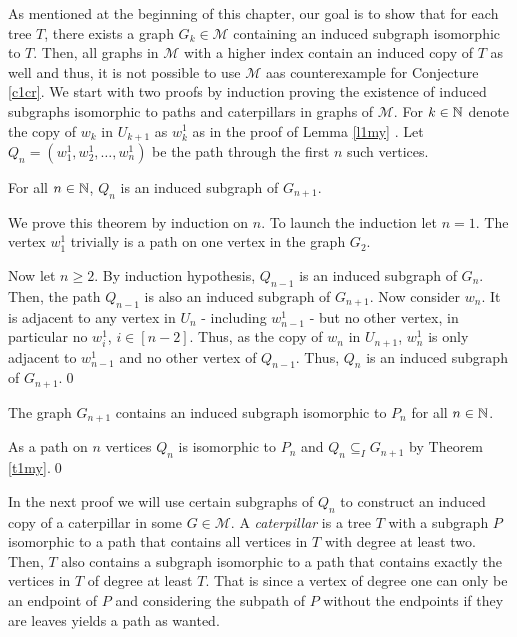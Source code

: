 As mentioned at the beginning of this chapter, our goal is to show that for each tree $T$, there exists a graph $G_k\in\mathcal{M}$ containing an induced subgraph isomorphic to $T$. Then, all graphs in $\mathcal{M}$ with a higher index contain an induced copy of $T$ as well and thus, it is not possible to use $\mathcal{M}$ aas counterexample for Conjecture \ref{c1cr}.
We start with two proofs by induction proving the existence of induced subgraphs isomorphic to paths and caterpillars in graphs of $\mathcal{M}$. For $k\in\mathbb{N}$ denote the copy of $w_k$ in $U_{k+1}$ as $w_k^1$ as in the proof of Lemma \ref{l1my} . Let $Q_n =(w_1^1 ,w_2^1 ,\dots ,w_n^1)$ be the path through the first $n$ such vertices. 
\begin{thm}\label{t1my}
For all $n\in\mathbb{N}$, $Q_n$ is an induced subgraph of $G_{n+1}$.
\end{thm}
\begin{prf}
We prove this theorem by induction on $n$. To launch the induction let $n=1$. The vertex $w_1^1$ trivially is a path on one vertex in the graph $G_2$.

Now let $n\geq 2$. By induction hypothesis, $Q_{n-1}$ is an induced subgraph of $G_n$. Then, the path $Q_{n-1}$ is also an induced subgraph of $G_{n+1}$. 
Now consider $w_n$. It is adjacent to any vertex in $U_n$ - including $w^1_{n-1}$ - but no other vertex, in particular no $w^1_i$, $i\in [n-2]$. Thus, as the copy of $w_n$ in $U_{n+1}$, $w^1_n$ is only adjacent to $w^1_{n-1}$ and no other vertex of $Q_{n-1}$. Thus, $Q_n$ is an induced subgraph of $G_{n+1}$.\qed
\end{prf}

\begin{cor}\label{c1my}
The graph $G_{n+1}$ contains an induced subgraph isomorphic to $P_n$ for all $n\in\mathbb{N}$.
\end{cor}
\begin{prf}
As a path on $n$ vertices $Q_n$ is isomorphic to $P_n$ and $Q_n\subseteq_I G_{n+1}$ by Theorem \ref{t1my}.\qed
\end{prf}

In the next proof we will use certain subgraphs of $Q_n$ to construct an induced copy of a caterpillar in some $G\in\mathcal{M}$. A \textit{caterpillar} is a tree $T$ with a subgraph $P$ isomorphic to a path that contains all vertices in $T$ with degree at least two. Then, $T$ also contains a subgraph isomorphic to a path that contains exactly the vertices in $T$ of degree at least $T$. That is since a vertex of degree one can only be an endpoint of $P$ and considering the subpath of $P$ without the endpoints if they are leaves yields a path as wanted.

